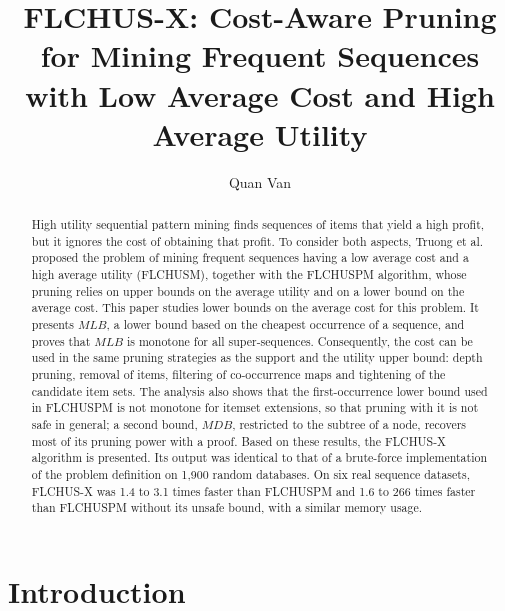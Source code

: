 \documentclass[runningheads]{llncs}
\newcommand{\FL}{\textsc{FLCHUSPM}}
\newcommand{\FX}{\textsc{FLCHUS-X}}
\newcommand{\mlb}{\ensuremath{\mathit{MLB}}}
\newcommand{\mdb}{\ensuremath{\mathit{MDB}}}
\begin{document}
\title{FLCHUS-X: Cost-Aware Pruning for Mining Frequent Sequences with Low Average Cost and High Average Utility}
\author{Quan Van}

\maketitle

\begin{abstract}
High utility sequential pattern mining finds sequences of items that yield a high profit, but it
ignores the cost of obtaining that profit. To consider both aspects, Truong et al. proposed the
problem of mining frequent sequences having a low average cost and a high average utility
(FLCHUSM), together with the \FL{} algorithm, whose pruning relies on upper bounds on the
average utility and on a lower bound on the average cost. This paper studies lower bounds on the
average cost for this problem. It presents \mlb, a lower bound based on the cheapest occurrence
of a sequence, and proves that \mlb{} is monotone for all super-sequences. Consequently, the cost
can be used in the same pruning strategies as the support and the utility upper bound: depth
pruning, removal of items, filtering of co-occurrence maps and tightening of the candidate item
sets. The analysis also shows that the first-occurrence lower bound used in \FL{} is not monotone
for itemset extensions, so that pruning with it is not safe in general; a second bound, \mdb,
restricted to the subtree of a node, recovers most of its pruning power with a proof. Based on
these results, the \FX{} algorithm is presented. Its output was identical to that of a
brute-force implementation of the problem definition on 1{,}900 random databases. On six real
sequence datasets, \FX{} was 1.4 to 3.1 times faster than \FL{} and 1.6 to 266 times faster
than \FL{} without its unsafe bound, with a similar memory usage.
\end{abstract}

\section{Introduction}
\end{document}
